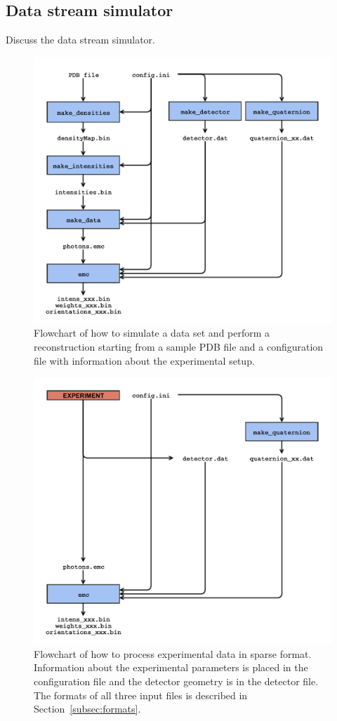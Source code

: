 \documentclass[]{iucr}              %
\begin{document}
\subsection{Data stream simulator}\label{sec:dataStreamSim}
Discuss the data stream simulator. 
\begin{figure}
\caption{Flowchart of how to simulate a data set and perform a reconstruction starting from a sample PDB file and a configuration file with information about the experimental setup.}
\includegraphics[width=\textwidth]{figures/emc_sim.pdf}
\end{figure}

\begin{figure}
\caption{Flowchart of how to process experimental data in sparse format. Information about the experimental parameters is placed in the configuration file and the detector geometry is in the detector file. The formats of all three input files is described in Section~\ref{subsec:formats}.}
\includegraphics[width=\textwidth]{figures/emc_exp.pdf}
\end{figure}
\end{document}
